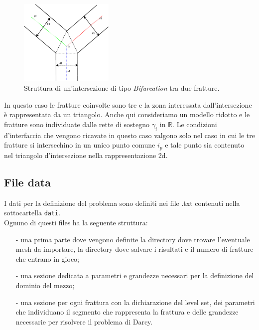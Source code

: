 \begin{figure}[htbp]
\begin{center}
\includegraphics[width=0.4\textwidth]{img/bifurcation.eps}
\caption{Struttura di un'intersezione di tipo \textit{Bifurcation} tra due fratture.}\label{Bifurcation}
\end{center}
\end{figure}

\noindent In questo caso le fratture coinvolte sono tre e la zona interessata dall'intersezione è rappresentata da un triangolo. Anche qui consideriamo un modello ridotto e le fratture sono individuate dalle rette di sostegno $\gamma_i$ in $\mathbb{R}$. Le condizioni d'interfaccia che vengono ricavate in questo caso valgono solo nel caso in cui le tre fratture si intersechino in un unico punto comune $i_p$ e tale punto sia contenuto nel triangolo d'intersezione nella rappresentazione 2d.

\subsection{File data}

I dati per la definizione del problema sono definiti nei file .txt contenuti nella sottocartella \texttt{dati}. \\
\noindent Ognuno di questi files ha la seguente struttura:

\begin{enumerate}
\item[-] una prima parte dove vengono definite la directory dove trovare l'eventuale mesh da importare, la directory dove salvare i risultati e il numero di fratture che entrano in gioco;
\item[-] una sezione dedicata a parametri e grandezze necessari per la definizione del dominio del mezzo;
\item[-] una sezione per ogni frattura con la dichiarazione del level set, dei parametri che individuano il segmento che rappresenta la frattura e delle grandezze necessarie per risolvere il problema di Darcy.
\end{enumerate}

